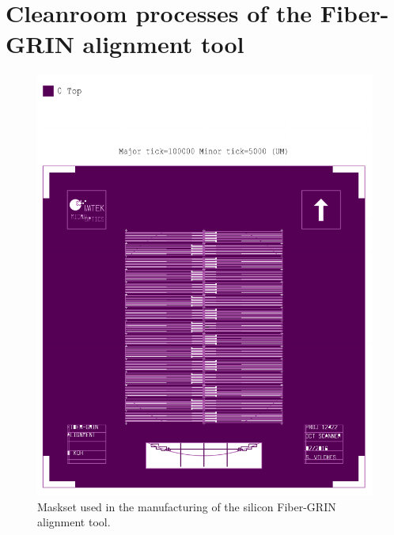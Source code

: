 \section{Cleanroom processes of the Fiber-GRIN alignment tool}
\begin{figure}[h!]\centering \includegraphics[width=12cm]{appendix/KOH.pdf}
      \caption{Maskset used in the manufacturing of the silicon Fiber-GRIN alignment tool.}
\end{figure}


\clearpage
